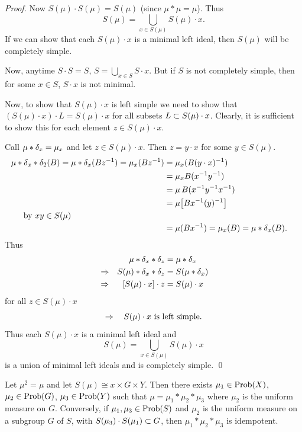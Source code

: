 \begin{proof}  Now $S(\mu) \cdot S(\mu) = S(\mu)$ (since $\mu * \mu = \mu$). 
Thus
\[
     S(\mu) = \bigcup_{x \in S(\mu)} S(\mu) \cdot x.
\]
If we can show that each $S(\mu) \cdot x$ is a minimal left ideal,
then $S(\mu)$ will be completely simple.

Now, anytime $S \cdot S = S$, $S = \bigcup\limits_{x \in S}
S \cdot x$.  
But if $S$ is not completely simple, then for some $x \in S$, $S \cdot x$ is not minimal.

Now, to show that $S(\mu) \cdot x$ is left simple we need to show
that $(S(\mu) \cdot x) \cdot L = S(\mu) \cdot x$ for all subsets
$L \subset S(\mu) \cdot x$.  
Clearly, it is sufficient to show this for each element $z \in S(\mu) \cdot x$.

Call $\mu * \delta_x = \mu_x$ and let $z \in S(\mu) \cdot x$.  
Then $z = y \cdot x$ for some $y \in S(\mu)$.
\[
\begin{aligned}
       \mu * \dl_x * \dl_2(B) = \mu * \dl_x(Bz^{-1})
               = \mu_x(Bz^{-1}) &= \mu_x (B(y \cdot x)^{-1})   \\
       &= \mu_x B(x^{-1}y^{-1})                                \\
       &= \mu\, B(x^{-1}y^{-1}x^{-1})                           \\
       &= \mu \big[ Bx^{-1} (y)^{-1} \big]                     \\
\noalign{by $xy \in S(\mu)$}
       &= \mu(Bx^{-1}) = \mu_x(B) = \mu * \dl_x(B).
\end{aligned}
\]
Thus
\[
\begin{alignedat}{2}
       & &\quad
       \mu * \delta_x * \delta_z &= \mu * \delta_x                      \\
       &\Rightarrow &\quad S(\mu) * \delta_x *\delta_z &= S(\mu * \delta_x)       \\
       &\Rightarrow &\quad [S(\mu) \cdot x] \cdot z &= S(\mu) \cdot x    \\
\end{alignedat}
\]
for all $z \in S(\mu) \cdot x$
\[
  \Rightarrow \quad S(\mu) \cdot x
	\hbox{ is left simple.} 
\]
Thus each $S(\mu) \cdot x$ is a minimal left ideal and
\[
     S(\mu) = \bigcup_{x \in S(\mu)} S(\mu) \cdot x
\]
is a union of minimal left ideals and is completely simple.
\qed
\end{proof}

\begin{theorem} 	\label{thm:3.2}
Let $\mu^2=\mu$ and let $S(\mu) \cong x \times G \times Y$.
Then there exists $\mu_1 \in \hbox{Prob}(X)$, $\mu_2 \in \hbox{Prob}(G)$, $\mu_3 \in \hbox{Prob}(Y)$ such that $\mu = \mu_1 * \mu_2 * \mu_3$ where $\mu_2$ is the uniform measure on $G$.  
Conversely, if $\mu_1,\mu_3 \in \hbox{Prob}(S)$ and $\mu_2$ is the uniform measure on a subgroup $G$ of $S$, with $S(\mu_3) \cdot S(\mu_1) \subset G$, then $\mu_1 * \mu_2 * \mu_3$ is idempotent.
\end{theorem}

